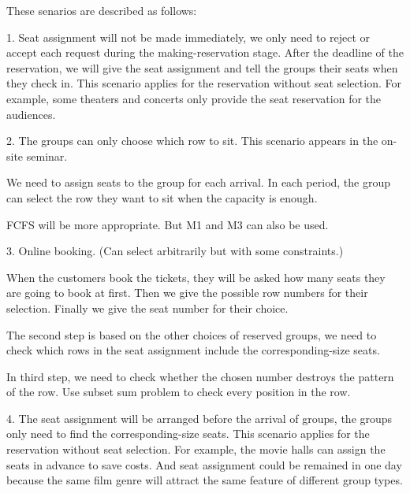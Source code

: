 These senarios are described as follows:

1. Seat assignment will not be made immediately, we only need to reject or accept each request during the making-reservation stage. After the deadline of the reservation, we will give the seat assignment and tell the groups their seats when they check in. This scenario applies for the reservation without seat selection. For example, some theaters and concerts only provide the seat reservation for the audiences.

2. The groups can only choose which row to sit. This scenario appears in the on-site seminar. 

We need to assign seats to the group for each arrival. In each period, the group can select the row they want to sit when the capacity is enough. 

FCFS will be more appropriate. But M1 and M3 can also be used.


3. Online booking. (Can select arbitrarily but with some constraints.)

When the customers book the tickets, they will be asked how many seats they are going to book at first. Then we give the possible row numbers for their selection. Finally we give the seat number for their choice.

The second step is based on the other choices of reserved groups, we need to check which rows in the seat assignment include the corresponding-size seats.

In third step, we need to check whether the chosen number destroys the pattern of the row. Use subset sum problem to check every position in the row.


4. The seat assignment will be arranged before the arrival of groups, the groups only need to find the corresponding-size seats. This scenario applies for the reservation without seat selection. For example, the movie halls can assign the seats in advance to save costs. And seat assignment could be remained in one day because the same film genre will attract the same feature of different group types.


